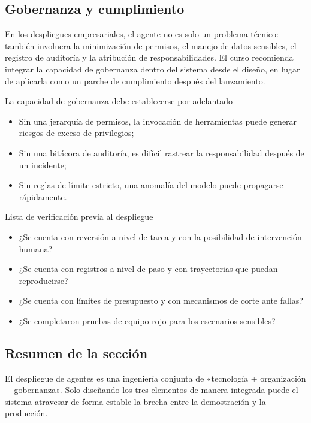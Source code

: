 \documentclass[a4paper]{article}
\begin{document}
\subsection{Gobernanza y cumplimiento}
En los despliegues empresariales, el agente no es solo un problema técnico: también involucra la minimización de permisos, el manejo de datos sensibles, el registro de auditoría y la atribución de responsabilidades. El curso recomienda integrar la capacidad de gobernanza dentro del sistema desde el diseño, en lugar de aplicarla como un parche de cumplimiento después del lanzamiento.

\begin{warningbox}{La capacidad de gobernanza debe establecerse por adelantado}
\begin{itemize}
    \item Sin una jerarquía de permisos, la invocación de herramientas puede generar riesgos de exceso de privilegios;
    \item Sin una bitácora de auditoría, es difícil rastrear la responsabilidad después de un incidente;
    \item Sin reglas de límite estricto, una anomalía del modelo puede propagarse rápidamente.
\end{itemize}
\end{warningbox}

\begin{knowledgebox}{Lista de verificación previa al despliegue}
\begin{itemize}
    \item ¿Se cuenta con reversión a nivel de tarea y con la posibilidad de intervención humana?
    \item ¿Se cuenta con registros a nivel de paso y con trayectorias que puedan reproducirse?
    \item ¿Se cuenta con límites de presupuesto y con mecanismos de corte ante fallas?
    \item ¿Se completaron pruebas de equipo rojo para los escenarios sensibles?
\end{itemize}
\end{knowledgebox}

\subsection{Resumen de la sección}
El despliegue de agentes es una ingeniería conjunta de «tecnología + organización + gobernanza». Solo diseñando los tres elementos de manera integrada puede el sistema atravesar de forma estable la brecha entre la demostración y la producción.
\end{document}
